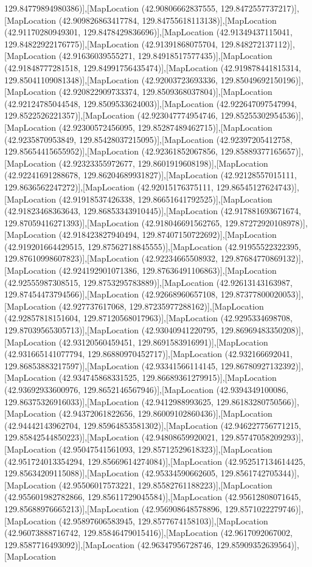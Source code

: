 129.84779894980386)],[MapLocation (42.90806662837555, 129.8472557737217)],[MapLocation (42.909826863417784, 129.84755618113138)],[MapLocation (42.91170280949301, 129.8478429836696)],[MapLocation (42.91349437115041, 129.84822922176775)],[MapLocation (42.91391868075704, 129.848272137112)],[MapLocation (42.91636039555271, 129.84918517577435)],[MapLocation (42.91848777281518, 129.84991756435474)],[MapLocation (42.919878441815314, 129.85041109081348)],[MapLocation (42.92003723693336, 129.85049692150196)],[MapLocation (42.920822909733374, 129.8509368037804)],[MapLocation (42.92124785044548, 129.8509533624003)],[MapLocation (42.922647097547994, 129.8522526221357)],[MapLocation (42.923047774954746, 129.85255302954536)],[MapLocation (42.92300572456095, 129.85287489462715)],[MapLocation (42.9235870953849, 129.85428037215095)],[MapLocation (42.92397205412758, 129.85654415655952)],[MapLocation (42.92361852067856, 129.85889377165657)],[MapLocation (42.92323355972677, 129.8601919608198)],[MapLocation (42.92241691288678, 129.86204689931827)],[MapLocation (42.92128557015111, 129.8636562247272)],[MapLocation (42.92015176375111, 129.86545127624743)],[MapLocation (42.91918537426338, 129.86651641792525)],[MapLocation (42.91823468363643, 129.86853343910445)],[MapLocation (42.917881693671674, 129.87059416271393)],[MapLocation (42.918046691562765, 129.87272920108978)],[MapLocation (42.918423827940494, 129.87407150722692)],[MapLocation (42.919201664429515, 129.87562718845555)],[MapLocation (42.91955522322395, 129.87610998607823)],[MapLocation (42.92234665508932, 129.87684770869132)],[MapLocation (42.924192901071386, 129.87636491106863)],[MapLocation (42.92555987308515, 129.8753295783889)],[MapLocation (42.92613143163987, 129.87454473794566)],[MapLocation (42.92668960657108, 129.87377800020053)],[MapLocation (42.927737617068, 129.87235977288162)],[MapLocation (42.92857818151604, 129.87120568017963)],[MapLocation (42.9295334698708, 129.87039565305713)],[MapLocation (42.93040941220795, 129.86969483350208)],[MapLocation (42.93120560459451, 129.8691583916991)],[MapLocation (42.931665141077794, 129.86880970452717)],[MapLocation (42.932166692041, 129.86853883217597)],[MapLocation (42.93341566114145, 129.86780927132392)],[MapLocation (42.934745868331525, 129.86689361279915)],[MapLocation (42.93692933600976, 129.8652146567946)],[MapLocation (42.9394349100086, 129.86375326916033)],[MapLocation (42.9412988993625, 129.86183280750566)],[MapLocation (42.94372061822656, 129.86009102860436)],[MapLocation (42.94442143962704, 129.85964853581302)],[MapLocation (42.946227756771215, 129.85842544850223)],[MapLocation (42.94808659920021, 129.85747058209293)],[MapLocation (42.95047541561093, 129.85712529618323)],[MapLocation (42.951724013354294, 129.85669614274084)],[MapLocation (42.952517134614425, 129.85634209115088)],[MapLocation (42.95334590662605, 129.8561742705344)],[MapLocation (42.95506017573221, 129.85582761188223)],[MapLocation (42.955601982782866, 129.85611729045584)],[MapLocation (42.95612808071645, 129.85688976665213)],[MapLocation (42.956908648578896, 129.8571022279746)],[MapLocation (42.95897606583945, 129.8577674158103)],[MapLocation (42.96073888716742, 129.85846479015416)],[MapLocation (42.9617092067002, 129.8587716493092)],[MapLocation (42.96347956728746, 129.85909352639564)],[MapLocation 